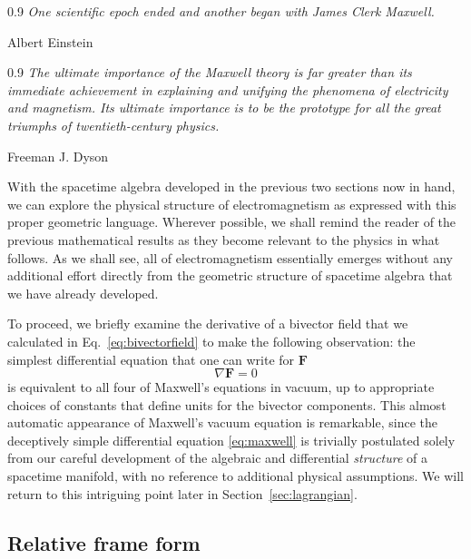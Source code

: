 \documentclass[1p,sort&compress]{elsarticle}
\numberwithin{equation}{section}
\newcommand{\bv}[1]{\mathbf{#1}}
\newcommand\epigraph[3]{
\vspace{1em}\hfill{}\begin{minipage}{#1}{\begin{spacing}{0.9}
\small\noindent\textit{#2}\end{spacing}
\vspace{1em}
\hfill{}{#3}}\vspace{2em}
\end{minipage}}
\begin{document}
\epigraph{4.5in}{One scientific epoch ended and another began with James Clerk Maxwell.}{Albert Einstein \cite{Arianrhod2006}} 


\epigraph{4.5in}{The ultimate importance of the Maxwell theory is far greater than its immediate achievement in explaining and unifying the phenomena of electricity and magnetism. Its ultimate importance is to be the prototype for all the great triumphs of twentieth-century physics.}{Freeman J. Dyson \cite{Dyson1999}}


With the spacetime algebra developed in the previous two sections now in hand, we can explore the physical structure of electromagnetism as expressed with this proper geometric language.  Wherever possible, we shall remind the reader of the previous mathematical results as they become relevant to the physics in what follows.  As we shall see, all of electromagnetism essentially emerges without any additional effort directly from the geometric structure of spacetime algebra that we have already developed.

To proceed, we briefly examine the derivative of a bivector field that we calculated in Eq.~\eqref{eq:bivectorfield} to make the following observation:  the simplest differential equation that one can write for $\bv{F}$ 
\begin{equation}\label{eq:maxwell}
  \nabla \bv{F} = 0
\end{equation}
is equivalent to all four of Maxwell's equations in vacuum, up to appropriate choices of constants that define units for the bivector components.  This almost automatic appearance of Maxwell's vacuum equation is remarkable, since the deceptively simple differential equation \eqref{eq:maxwell} is trivially postulated solely from our careful development of the algebraic and differential \emph{structure} of a spacetime manifold, with no reference to additional physical assumptions.  We will return to this intriguing point later in Section~\ref{sec:lagrangian}.


\subsection{Relative frame form}
\end{document}
